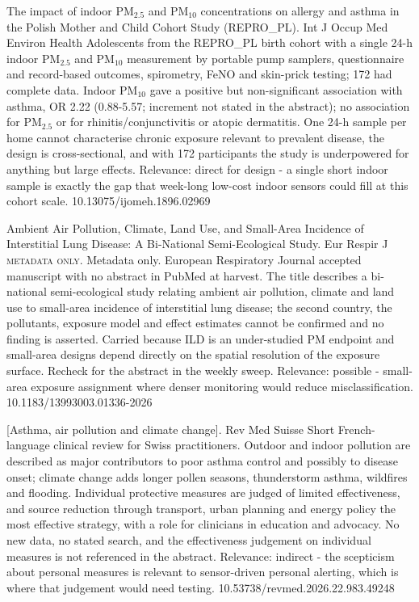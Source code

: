 \documentclass[10pt]{article}
\begin{document}
{The impact of indoor PM$_{2.5}$ and PM$_{10}$ concentrations on allergy and asthma in the Polish Mother and Child Cohort Study (REPRO\_PL).}
{Int J Occup Med Environ Health}
{Adolescents from the REPRO\_PL birth cohort with a single 24-h indoor PM$_{2.5}$ and PM$_{10}$ measurement by portable pump samplers, questionnaire and record-based outcomes, spirometry, FeNO and skin-prick testing; 172 had complete data. Indoor PM$_{10}$ gave a positive but non-significant association with asthma, OR 2.22 (0.88-5.57; increment not stated in the abstract); no association for PM$_{2.5}$ or for rhinitis/conjunctivitis or atopic dermatitis. One 24-h sample per home cannot characterise chronic exposure relevant to prevalent disease, the design is cross-sectional, and with 172 participants the study is underpowered for anything but large effects. Relevance: direct for design - a single short indoor sample is exactly the gap that week-long low-cost indoor sensors could fill at this cohort scale.}
{10.13075/ijomeh.1896.02969}

{Ambient Air Pollution, Climate, Land Use, and Small-Area Incidence of Interstitial Lung Disease: A Bi-National Semi-Ecological Study.}
{Eur Respir J}
{\textsc{metadata only.} Metadata only. European Respiratory Journal accepted manuscript with no abstract in PubMed at harvest. The title describes a bi-national semi-ecological study relating ambient air pollution, climate and land use to small-area incidence of interstitial lung disease; the second country, the pollutants, exposure model and effect estimates cannot be confirmed and no finding is asserted. Carried because ILD is an under-studied PM endpoint and small-area designs depend directly on the spatial resolution of the exposure surface. Recheck for the abstract in the weekly sweep. Relevance: possible - small-area exposure assignment where denser monitoring would reduce misclassification.}
{10.1183/13993003.01336-2026}

{[Asthma, air pollution and climate change].}
{Rev Med Suisse}
{Short French-language clinical review for Swiss practitioners. Outdoor and indoor pollution are described as major contributors to poor asthma control and possibly to disease onset; climate change adds longer pollen seasons, thunderstorm asthma, wildfires and flooding. Individual protective measures are judged of limited effectiveness, and source reduction through transport, urban planning and energy policy the most effective strategy, with a role for clinicians in education and advocacy. No new data, no stated search, and the effectiveness judgement on individual measures is not referenced in the abstract. Relevance: indirect - the scepticism about personal measures is relevant to sensor-driven personal alerting, which is where that judgement would need testing.}
{10.53738/revmed.2026.22.983.49248}
\end{document}
